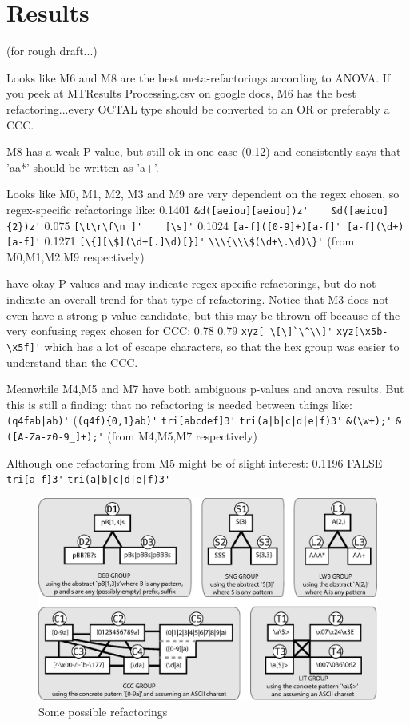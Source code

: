 
\section{Results}

(for rough draft...)

Looks like M6 and M8 are the best meta-refactorings according to ANOVA.
If you peek at MTResults Processing.csv on google docs, M6 has the best refactoring...every OCTAL type should be converted to an OR or preferably a CCC.

M8 has a weak P value, but still ok in one case (0.12) and consistently says that 'aa*' should be written as 'a+'.

Looks like M0, M1, M2, M3 and M9 are very dependent on the regex chosen, so regex-specific refactorings like:
0.1401 \verb!&d([aeiou][aeiou])z'    &d([aeiou]{2})z'!
0.075   \verb![\t\r\f\n ]'    [\s]'!
0.1024  \verb![a-f]([0-9]+)[a-f]' [a-f](\d+)[a-f]'!
0.1271  \verb![\{][\$](\d+[.]\d)[}]'!
\verb!\\\{\\\$(\d+\.\d)\}'!
(from M0,M1,M2,M9 respectively)

have okay P-values and may indicate regex-specific refactorings, but do not indicate an overall trend for that type of refactoring.
Notice that M3 does not even have a strong p-value candidate, but this may be thrown off because of the very confusing regex chosen for CCC:
0.78    0.79
\verb!xyz[_\[\]`\^\\]'!    \verb!xyz[\x5b-\x5f]'!
which has a lot of escape characters, so that the hex group was easier to understand than the CCC.



Meanwhile M4,M5 and M7 have both ambiguous p-values and anova results.  But this is still a finding: that no refactoring is needed between things like:
\verb!(q4fab|ab)'! (\verb!(q4f){0,1}ab)'!
\verb!tri[abcdef]3'!   \verb!tri(a|b|c|d|e|f)3'!
\verb!&(\w+);'!    \verb!&([A-Za-z0-9_]+);'!
(from M4,M5,M7 respectively)

Although one refactoring from M5 might be of slight interest:
0.1196  FALSE   \verb!tri[a-f]3'!  \verb!tri(a|b|c|d|e|f)3'!


\begin{figure}[tb]
\centering
\includegraphics[width=\textwidth]{illustrations/refactoringTree.eps}
\vspace{-12pt}
\caption{Some possible refactorings}
\vspace{-6pt}
\label{fig:refactoringTree}
\end{figure}

